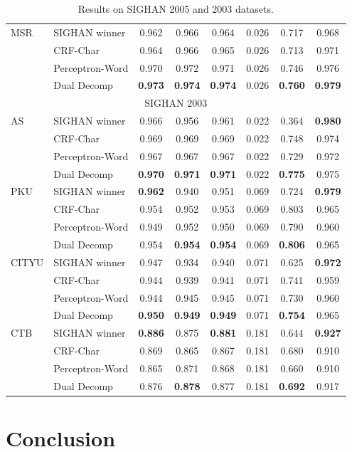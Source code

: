 \documentclass[11pt]{article}
\begin{document}
\begin{table*}
\begin{tabular}{ l | l | c | c | c | c | c | c   }
\hline
\multirow{4}{*}{MSR} &  SIGHAN winner      & 0.962  & 0.966 &  0.964 &  0.026 &   0.717 &   0.968 \\
& CRF-Char        &  0.964 &   0.966 &  0.965 & 0.026 & 0.713 & 0.971 \\
& Perceptron-Word &  0.970 &  0.972 &  0.971 & 0.026 & 0.746 & 0.976 \\
& Dual Decomp & \textbf{0.973} &  \textbf{0.974} &  \textbf{0.974} & 0.026 & \textbf{0.760} & \textbf{0.979} \\
\hline
\multicolumn{8}{c}{\large{SIGHAN 2003}} \\
\hline

\multirow{4}{*}{AS}  &  SIGHAN winner     & 0.966     & 0.956 &  0.961 & 0.022 & 0.364 &  \textbf{0.980} \\
& CRF-Char    & 0.969 & 0.969 & 0.969 & 0.022 & 0.748 &  0.974 \\
& Perceptron-Word &  0.967 & 0.967 & 0.967 & 0.022 & 0.729  & 0.972 \\
& Dual Decomp & \textbf{0.970} & \textbf{0.971} & \textbf{0.971} & 0.022 & \textbf{0.775}  & 0.975 \\
\hline
\multirow{4}{*}{PKU}  &  SIGHAN winner        &   \textbf{0.962} &   0.940&  0.951 & 0.069 & 0.724 & \textbf{0.979} \\
& CRF-Char     &  0.954 & 0.952 & 0.953 & 0.069 & 0.803	 & 0.965 \\
& Perceptron-Word &  0.949 & 0.952 & 0.950 & 0.069 & 0.790  & 0.960 \\
& Dual Decomp &  0.954 & \textbf{0.954} & \textbf{0.954}	 & 0.069 & \textbf{0.806} & 0.965 \\
\hline
\multirow{4}{*}{CITYU}  &  SIGHAN winner   &  0.947   & 0.934  & 0.940 & 0.071  &  0.625  &  \textbf{0.972} \\
& CRF-Char       &  0.944 & 0.939 & 0.941 & 0.071  & 0.741   & 0.959 \\
& Perceptron-Word &  0.944 & 0.945 & 0.945 & 0.071  & 0.730  &  0.960 \\
& Dual Decomp &  \textbf{0.950} & \textbf{0.949} & \textbf{0.949} & 0.071 & \textbf{0.754} &  0.965 \\
\hline
\multirow{4}{*}{CTB}  &  SIGHAN winner  &  \textbf{0.886}  & 0.875 &  \textbf{0.881} & 0.181 & 0.644  & \textbf{0.927} \\
& CRF-Char       & 0.869 & 0.865 & 0.867 & 0.181 & 0.680  & 0.910 \\
& Perceptron-Word & 0.865 & 0.871 & 0.868 & 0.181 & 0.660 & 0.910 \\
& Dual Decomp  & 0.876 & \textbf{0.878} & 0.877\footnotemark & 0.181 & \textbf{0.692} & 0.917  \\


\end{tabular} 
\caption{Results on SIGHAN 2005 and 2003 datasets. }\label{tbl:results}
\end{table*}


\section{Conclusion}



\end{document}
